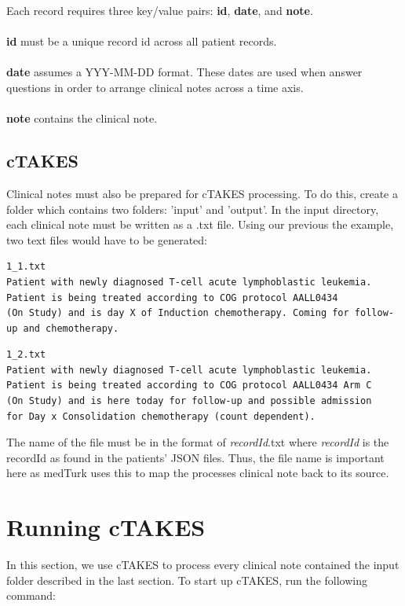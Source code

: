 \documentclass{book}
\begin{document}
Each record requires three key/value pairs: \textbf{id}, \textbf{date}, and \textbf{note}.
\\
\\
\textbf{id} must be a unique record id across all patient records.
\\
\\
\textbf{date} assumes a YYY-MM-DD format. These dates are used when answer questions in order to arrange clinical notes across a time axis.
\\
\\
\textbf{note} contains the clinical note.


\subsection*{cTAKES}

Clinical notes must also be prepared for cTAKES processing. To do this, create a folder which contains two folders: 'input' and 'output'. In the input directory, each clinical note must be written as a .txt file. Using our previous the example, two text files would have to be generated:

\begin{verbatim}
1_1.txt
Patient with newly diagnosed T-cell acute lymphoblastic leukemia. 
Patient is being treated according to COG protocol AALL0434 
(On Study) and is day X of Induction chemotherapy. Coming for follow-up and chemotherapy.
\end{verbatim}

\begin{verbatim}
1_2.txt
Patient with newly diagnosed T-cell acute lymphoblastic leukemia. 
Patient is being treated according to COG protocol AALL0434 Arm C 
(On Study) and is here today for follow-up and possible admission 
for Day x Consolidation chemotherapy (count dependent).
\end{verbatim}


The name of the file must be in the format of \emph{recordId}.txt where \emph{recordId} is the recordId as found in the patients' JSON files. Thus, the file name is important here as medTurk uses this to map the processes clinical note back to its source.

\section{Running cTAKES}

In this section, we use cTAKES to process every clinical note contained the input folder described in the last section. To start up cTAKES, run the following command:
\end{document}

